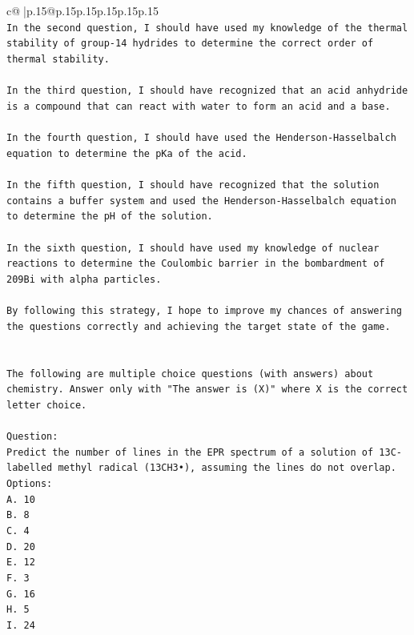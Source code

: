 \documentclass{article}
\begin{document}
{\begin{supertabular}{c@{$\;$}|p{.15\linewidth}@{}p{.15\linewidth}p{.15\linewidth}p{.15\linewidth}p{.15\linewidth}p{.15\linewidth}}
{{{\\ 
\texttt{In the second question, I should have used my knowledge of the thermal stability of group{-}14 hydrides to determine the correct order of thermal stability.} \\
\\ 
\texttt{In the third question, I should have recognized that an acid anhydride is a compound that can react with water to form an acid and a base.} \\
\\ 
\texttt{In the fourth question, I should have used the Henderson{-}Hasselbalch equation to determine the pKa of the acid.} \\
\\ 
\texttt{In the fifth question, I should have recognized that the solution contains a buffer system and used the Henderson{-}Hasselbalch equation to determine the pH of the solution.} \\
\\ 
\texttt{In the sixth question, I should have used my knowledge of nuclear reactions to determine the Coulombic barrier in the bombardment of 209Bi with alpha particles.} \\
\\ 
\texttt{By following this strategy, I hope to improve my chances of answering the questions correctly and achieving the target state of the game.} \\
\\ 
\\ 
\texttt{The following are multiple choice questions (with answers) about chemistry. Answer only with "The answer is (X)" where X is the correct letter choice.} \\
\\ 
\texttt{Question:} \\
\texttt{Predict the number of lines in the EPR spectrum of a solution of 13C{-}labelled methyl radical (13CH3•), assuming the lines do not overlap.} \\
\texttt{Options:} \\
\texttt{A. 10} \\
\texttt{B. 8} \\
\texttt{C. 4} \\
\texttt{D. 20} \\
\texttt{E. 12} \\
\texttt{F. 3} \\
\texttt{G. 16} \\
\texttt{H. 5} \\
\texttt{I. 24} \\
}}}
\end{supertabular}}
\end{document}
